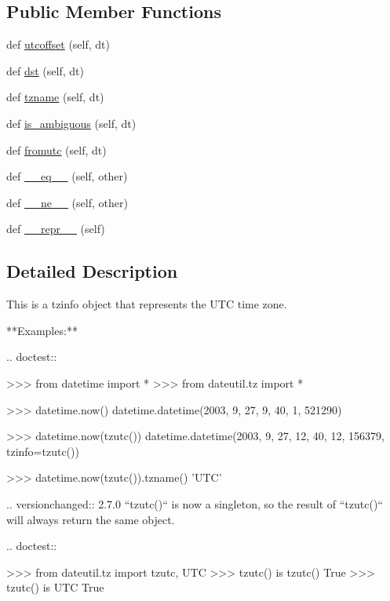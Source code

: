 \subsection*{Public Member Functions}
\begin{DoxyCompactItemize}
\item 
def \hyperlink{classdateutil_1_1tz_1_1tz_1_1tzutc_ade9369259a30b9b7c3bc5911375d4333}{utcoffset} (self, dt)
\item 
def \hyperlink{classdateutil_1_1tz_1_1tz_1_1tzutc_a9720fdfaa7e1e09e3b9467499cced534}{dst} (self, dt)
\item 
def \hyperlink{classdateutil_1_1tz_1_1tz_1_1tzutc_a1828b8080ae35b15063af36d17ba1fd2}{tzname} (self, dt)
\item 
def \hyperlink{classdateutil_1_1tz_1_1tz_1_1tzutc_aaca952d8eb6f9f90e92ec48ab1487fb8}{is\+\_\+ambiguous} (self, dt)
\item 
def \hyperlink{classdateutil_1_1tz_1_1tz_1_1tzutc_aeaaa6833ebd3c9c1568b8d4e57b16329}{fromutc} (self, dt)
\item 
def \hyperlink{classdateutil_1_1tz_1_1tz_1_1tzutc_ad8650e6d39bfd697ded0f72c5d1d824d}{\+\_\+\+\_\+eq\+\_\+\+\_\+} (self, other)
\item 
def \hyperlink{classdateutil_1_1tz_1_1tz_1_1tzutc_a5ce88af5c0b17d6dab1818dc36b5062a}{\+\_\+\+\_\+ne\+\_\+\+\_\+} (self, other)
\item 
def \hyperlink{classdateutil_1_1tz_1_1tz_1_1tzutc_a9c129b5c78ba1c65072337f097062e82}{\+\_\+\+\_\+repr\+\_\+\+\_\+} (self)
\end{DoxyCompactItemize}


\subsection{Detailed Description}
\begin{DoxyVerb}This is a tzinfo object that represents the UTC time zone.

**Examples:**

.. doctest::

    >>> from datetime import *
    >>> from dateutil.tz import *

    >>> datetime.now()
    datetime.datetime(2003, 9, 27, 9, 40, 1, 521290)

    >>> datetime.now(tzutc())
    datetime.datetime(2003, 9, 27, 12, 40, 12, 156379, tzinfo=tzutc())

    >>> datetime.now(tzutc()).tzname()
    'UTC'

.. versionchanged:: 2.7.0
    ``tzutc()`` is now a singleton, so the result of ``tzutc()`` will
    always return the same object.

    .. doctest::

        >>> from dateutil.tz import tzutc, UTC
        >>> tzutc() is tzutc()
        True
        >>> tzutc() is UTC
        True
\end{DoxyVerb}
 

